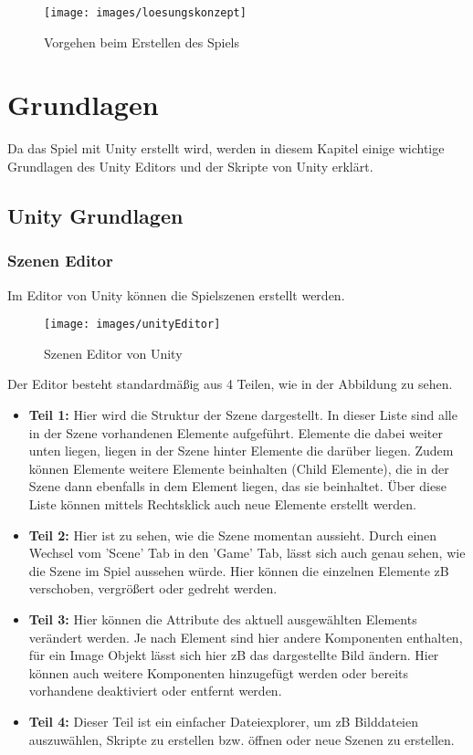 \begin{figure}[htbp]
  \centering
  \texttt{[image: images/loesungskonzept]}
  \caption{Vorgehen beim Erstellen des Spiels}
  \label{fig:1}
\end{figure}


\chapter{Grundlagen}
\label{cha:grundlagen}

Da das Spiel mit Unity erstellt wird, werden in diesem Kapitel einige wichtige Grundlagen des Unity Editors und der Skripte von Unity erklärt.

\section{Unity Grundlagen}
\label{sec:grundlagenunity}

\subsection{Szenen Editor}
\label{sub:szenenEditor}
Im Editor von Unity können die Spielszenen erstellt werden.
\begin{figure}[htbp]
  \centering
  \texttt{[image: images/unityEditor]}
  \caption{Szenen Editor von Unity}
  \label{fig:unityEditor}
\end{figure}
Der Editor besteht standardmäßig aus 4 Teilen, wie in der Abbildung zu sehen.
\begin{itemize}
	\item \textbf{Teil 1:} Hier wird die Struktur der Szene dargestellt. In dieser Liste sind alle in der Szene vorhandenen Elemente aufgeführt. Elemente die dabei weiter unten liegen, liegen in der Szene hinter Elemente die darüber liegen. Zudem können Elemente weitere Elemente beinhalten (Child Elemente), die in der Szene dann ebenfalls in dem Element liegen, das sie beinhaltet. Über diese Liste können mittels Rechtsklick auch neue Elemente erstellt werden.
	\item \textbf{Teil 2:} Hier ist zu sehen, wie die Szene momentan aussieht. Durch einen Wechsel vom 'Scene' Tab in den 'Game' Tab, lässt sich auch genau sehen, wie die Szene im Spiel aussehen würde. Hier können die einzelnen Elemente zB verschoben, vergrößert oder gedreht werden.
	\item \textbf{Teil 3:} Hier können die Attribute des aktuell ausgewählten Elements verändert werden. Je nach Element sind hier andere Komponenten enthalten, für ein Image Objekt lässt sich hier zB das dargestellte Bild ändern. Hier können auch weitere Komponenten hinzugefügt werden oder bereits vorhandene deaktiviert oder entfernt werden.
	\item \textbf{Teil 4:} Dieser Teil ist ein einfacher Dateiexplorer, um zB Bilddateien auszuwählen, Skripte zu erstellen bzw. öffnen oder neue Szenen zu erstellen.
\end{itemize}

